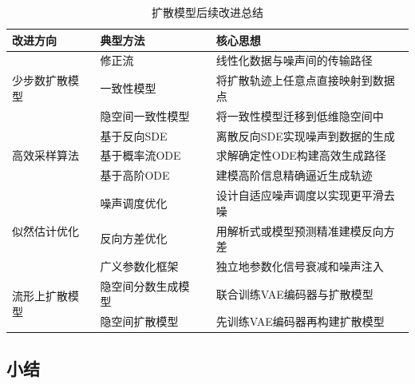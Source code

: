 \documentclass[11pt,a4paper,UTF8]{ctexart}
\begin{document}
\begin{table}[t]
\caption{扩散模型后续改进总结}
\vspace{-4mm}
\begin{center}
\begin{tabular}{p{2.6cm}|p{5.7cm}|p{6.6cm}}
\toprule
改进方向 & 典型方法 & 核心思想 \\
\midrule
\multirow{3}{*}{少步数扩散模型} & 修正流~\cite{liu2022flow} & 线性化数据与噪声间的传输路径\\
                       & 一致性模型~\cite{pmlr-v202-song23a} & 将扩散轨迹上任意点直接映射到数据点 \\
                       & 隐空间一致性模型~\cite{luo2023latent} & 将一致性模型迁移到低维隐空间中 \\
\midrule
\multirow{3}{*}{高效采样算法} & 基于反向SDE~\cite{song2019generative,JolicoeurMartineau2021AdversarialSM,song2020score,jolicoeur2021gotta,dockhorn2021score} & 离散反向SDE实现噪声到数据的生成 \\
                       & 基于概率流ODE~\cite{song2020denoising,zhang2022gddim,liu2021pseudo} & 求解确定性ODE构建高效生成路径 \\
                       & 基于高阶ODE~\cite{karras2022elucidating,zhang2022fast,lu2022dpm,dockhorn2022genie,shaul2023bespoke} & 建模高阶信息精确逼近生成轨迹 \\
\midrule
\multirow{3}{*}{似然估计优化} & 噪声调度优化~\cite{nichol2021improved} & 设计自适应噪声调度以实现更平滑去噪 \\
                       & 反向方差优化~\cite{bao2021analytic,nichol2021improved,peebles2022scalable} & 用解析式或模型预测精准建模反向方差 \\
                       & 广义参数化框架~\cite{kingma2021variational} & 独立地参数化信号衰减和噪声注入 \\
\midrule
\multirow{2}{*}{流形上扩散模型} & 隐空间分数生成模型~\cite{vahdat2021score} & 联合训练VAE编码器与扩散模型 \\
                        & 隐空间扩散模型~\cite{rombach2022high} & 先训练VAE编码器再构建扩散模型 \\
\bottomrule
\end{tabular}
\end{center}
\label{tab:advanced_diffusion}
\end{table}

\subsection{小结}
\end{document}

